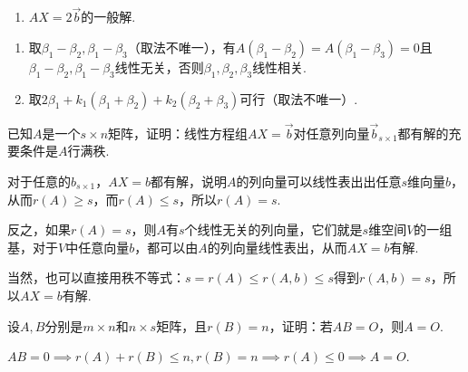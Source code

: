 \begin{exercise}
\begin{exgroup}
\begin{enumerate}
            \item $AX=2\vec{b}$的一般解.
        \end{enumerate}
        \begin{answer}
            \begin{enumerate}
                \item 取$\beta_1-\beta_2,\beta_1-\beta_3$（取法不唯一），有$A(\beta_1-\beta_2)=A(\beta_1-\beta_3)=0$且$\beta_1-\beta_2,\beta_1-\beta_3$线性无关，否则$\beta_1,\beta_2,\beta_3$线性相关.

                \item 取$2\beta_1+k_1(\beta_1+\beta_2)+k_2(\beta_2+\beta_3)$可行（取法不唯一）.
            \end{enumerate}
        \end{answer}

        \item 已知$A$是一个$s\times n$矩阵，证明：线性方程组$AX=\vec{b}$对任意列向量$\vec{b}_{s\times 1}$都有解的充要条件是$A$行满秩.
        \begin{answer}
            对于任意的$b_{s\times 1}$，$AX=b$都有解，说明$A$的列向量可以线性表出出任意$s$维向量$b$，从而$r(A)\geqslant s$，而$r(A)\leqslant s$，所以$r(A)=s$.

          反之，如果$r(A)=s$，则$A$有$s$个线性无关的列向量，它们就是$s$维空间$V$的一组基，对于$V$中任意向量$b$，都可以由$A$的列向量线性表出，从而$AX=b$有解.

          当然，也可以直接用秩不等式：$s=r(A)\leqslant r(A,b)\leqslant s$得到$r(A,b)=s$，所以$AX=b$有解.
        \end{answer}

        \item 设$A,B$分别是$m \times n$和$n \times s$矩阵，且$r(B)=n$，证明：若$AB=O$，则$A=O$.
        \begin{answer}
            $AB=0\implies r(A)+r(B)\leqslant n,r(B)=n\implies r(A)\leqslant 0\implies A=O$.
        \end{answer}


\end{exgroup}
\end{exercise}
